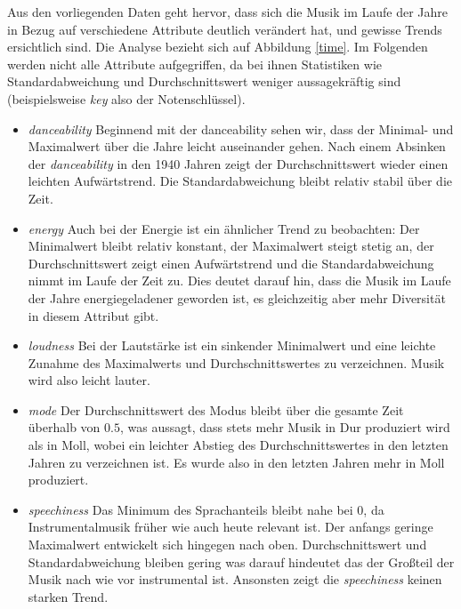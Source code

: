 \documentclass[conference]{IEEEtran}
\begin{document}
Aus den vorliegenden Daten geht hervor, dass sich die Musik im Laufe der Jahre in Bezug auf verschiedene Attribute deutlich verändert hat, und gewisse Trends ersichtlich sind. Die Analyse bezieht sich auf Abbildung \eqref{time}. Im Folgenden werden nicht alle Attribute aufgegriffen, da bei ihnen Statistiken wie Standardabweichung und Durchschnittswert weniger aussagekräftig sind (beispielsweise \textit{key} also der Notenschlüssel).

\begin{itemize}
\item{\textit{danceability}} Beginnend mit der danceability sehen wir, dass der Minimal- und Maximalwert über die Jahre leicht auseinander gehen. Nach einem Absinken der \textit{danceability} in den 1940 Jahren zeigt der Durchschnittswert wieder einen leichten Aufwärtstrend. Die Standardabweichung bleibt relativ stabil über die Zeit.

\item{\textit{energy}} Auch bei der Energie ist ein ähnlicher Trend zu beobachten: Der Minimalwert bleibt relativ konstant, der Maximalwert steigt stetig an, der Durchschnittswert zeigt einen Aufwärtstrend und die Standardabweichung nimmt im Laufe der Zeit zu. Dies deutet darauf hin, dass die Musik im Laufe der Jahre energiegeladener geworden ist, es gleichzeitig aber mehr Diversität in diesem Attribut gibt.

\item{\textit{loudness}} Bei der Lautstärke ist ein sinkender Minimalwert und eine leichte Zunahme des Maximalwerts und Durchschnittswertes zu verzeichnen. Musik wird also leicht lauter.

\item{\textit{mode}} Der Durchschnittswert des Modus bleibt über die gesamte Zeit überhalb von $0.5$, was aussagt, dass stets mehr Musik in Dur produziert wird als in Moll, wobei ein leichter Abstieg des Durchschnittswertes in den letzten Jahren zu verzeichnen ist. Es wurde also in den letzten Jahren mehr in Moll produziert.

\item{\textit{speechiness}} Das Minimum des Sprachanteils bleibt nahe bei $0$, da Instrumentalmusik früher wie auch heute relevant ist. Der anfangs geringe Maximalwert entwickelt sich hingegen nach oben. Durchschnittswert und Standardabweichung bleiben gering was darauf hindeutet das der Großteil der Musik nach wie vor instrumental ist. Ansonsten zeigt die \textit{speechiness} keinen starken Trend.


\end{itemize}
\end{document}
